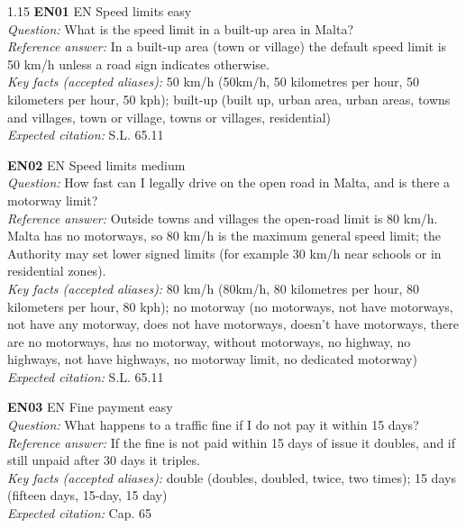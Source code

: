\begin{spacing}{1.15}
\footnotesize
\noindent\textbf{EN01} \quad EN \quad Speed limits \quad easy \\
\textit{Question:} What is the speed limit in a built-up area in Malta? \\
\textit{Reference answer:} In a built-up area (town or village) the default speed limit is 50 km/h unless a road sign indicates otherwise. \\
\textit{Key facts (accepted aliases):} 50 km/h (50km/h, 50 kilometres per hour, 50 kilometers per hour, 50 kph); built-up (built up, urban area, urban areas, towns and villages, town or village, towns or villages, residential) \\
\textit{Expected citation:} S.L. 65.11
\par\vspace{5pt}
\noindent\textbf{EN02} \quad EN \quad Speed limits \quad medium \\
\textit{Question:} How fast can I legally drive on the open road in Malta, and is there a motorway limit? \\
\textit{Reference answer:} Outside towns and villages the open-road limit is 80 km/h. Malta has no motorways, so 80 km/h is the maximum general speed limit; the Authority may set lower signed limits (for example 30 km/h near schools or in residential zones). \\
\textit{Key facts (accepted aliases):} 80 km/h (80km/h, 80 kilometres per hour, 80 kilometers per hour, 80 kph); no motorway (no motorways, not have motorways, not have any motorway, does not have motorways, doesn't have motorways, there are no motorways, has no motorway, without motorways, no highway, no highways, not have highways, no motorway limit, no dedicated motorway) \\
\textit{Expected citation:} S.L. 65.11
\par\vspace{5pt}
\noindent\textbf{EN03} \quad EN \quad Fine payment \quad easy \\
\textit{Question:} What happens to a traffic fine if I do not pay it within 15 days? \\
\textit{Reference answer:} If the fine is not paid within 15 days of issue it doubles, and if still unpaid after 30 days it triples. \\
\textit{Key facts (accepted aliases):} double (doubles, doubled, twice, two times); 15 days (fifteen days, 15-day, 15 day) \\
\textit{Expected citation:} Cap. 65

\end{spacing}
